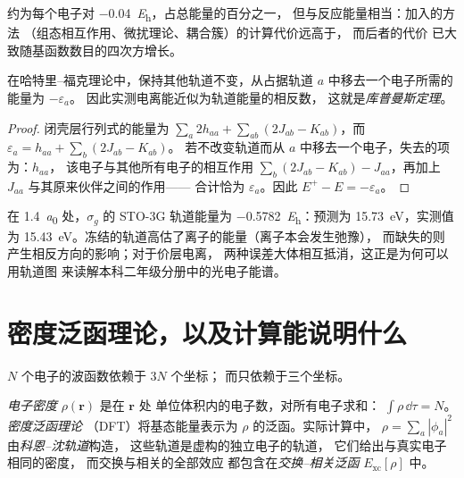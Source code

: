 约为每个电子对 \qty{-0.04}{\hartree}，占总能量的百分之一，
但与反应能量相当：加入的方法
（组态相互作用、微扰理论、耦合簇）的计算代价远高于，
而后者的代价
已大致随基函数数目的四次方增长。

\begin{theorem}[库普曼斯定理]\label{thm:b3:computational-chemistry:koopmans}
在哈特里–福克理论中，保持其他轨道不变，从占据轨道
$a$ 中移去一个电子所需的能量为 $-\varepsilon_a$。
因此实测电离能近似为轨道能量的相反数，
这就是\emph{库普曼斯定理}。
\end{theorem}

\begin{proof}
闭壳层行列式的能量为 $\sum_a2h_{aa} + \sum_{ab}(2J_{ab} -
K_{ab})$，而 $\varepsilon_a = h_{aa} + \sum_b(2J_{ab} - K_{ab})$。
若不改变轨道而从 $a$ 中移去一个电子，失去的项为：$h_{aa}$，
该电子与其他所有电子的相互作用 $\sum_b(2J_{ab} - K_{ab}) -
J_{aa}$，再加上 $J_{aa}$ 与其原来伙伴之间的作用——
合计恰为 $\varepsilon_a$。因此 $E^+ - E = -\varepsilon_a$。
\end{proof}

\begin{example}[电离 \ce{H2}]\label{ex:b3:computational-chemistry:koopmans}
在 \qty{1.4}{\bohr} 处，$\sigma_g$ 的 STO-3G 轨道能量为
\qty{-0.5782}{\hartree}：预测为 \qty{15.73}{eV}，实测值为
\qty{15.43}{eV}。冻结的轨道高估了离子的能量（离子本会发生弛豫），
而缺失的则产生相反方向的影响；对于价层电离，
两种误差大体相互抵消，这正是为何可以用轨道图
来读解本科二年级分册中的光电子能谱。
\end{example}

\section{密度泛函理论，以及计算能说明什么}

$N$ 个电子的波函数依赖于 $3N$ 个坐标；
而只依赖于三个坐标。

\begin{definition}\label{def:b3:computational-chemistry:dft}
\emph{电子密度} $\rho(\mathbf r)$ 是在 $\mathbf r$ 处
单位体积内的电子数，对所有电子求和：
$\int\rho\,\dd\tau = N$。\emph{密度泛函理论}
（DFT）将基态能量表示为 $\rho$ 的泛函。实际计算中，
$\rho = \sum_a|\phi_a|^2$ 由\emph{科恩–沈轨道}构造，
这些轨道是虚构的独立电子的轨道，
它们给出与真实电子相同的密度，
而交换与相关的全部效应
都包含在\emph{交换–相关泛函} $E_{\mathrm{xc}}[\rho]$ 中。
\end{definition}

